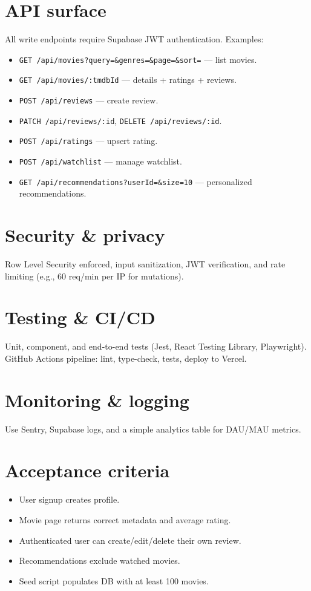 \documentclass[11pt,a4paper]{article}
\begin{document}
\section{API surface}
All write endpoints require Supabase JWT authentication.  
Examples:
\begin{itemize}
  \item \texttt{GET /api/movies?query=\&genres=\&page=\&sort=} — list movies.
  \item \texttt{GET /api/movies/:tmdbId} — details + ratings + reviews.
  \item \texttt{POST /api/reviews} — create review.
  \item \texttt{PATCH /api/reviews/:id}, \texttt{DELETE /api/reviews/:id}.
  \item \texttt{POST /api/ratings} — upsert rating.
  \item \texttt{POST /api/watchlist} — manage watchlist.
  \item \texttt{GET /api/recommendations?userId=\&size=10} — personalized recommendations.
\end{itemize}

\section{Security \& privacy}
Row Level Security enforced, input sanitization, JWT verification, and rate limiting (e.g., 60 req/min per IP for mutations).

\section{Testing \& CI/CD}
Unit, component, and end-to-end tests (Jest, React Testing Library, Playwright).  
GitHub Actions pipeline: lint, type-check, tests, deploy to Vercel.

\section{Monitoring \& logging}
Use Sentry, Supabase logs, and a simple analytics table for DAU/MAU metrics.

\section{Acceptance criteria}
\begin{itemize}
  \item User signup creates profile.
  \item Movie page returns correct metadata and average rating.
  \item Authenticated user can create/edit/delete their own review.
  \item Recommendations exclude watched movies.
  \item Seed script populates DB with at least 100 movies.
\end{itemize}
\end{document}
